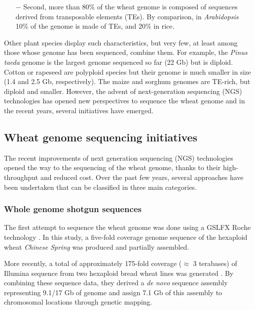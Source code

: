 \documentclass[a4paper, 12pt]{article}
\begin{document}
\begin{onehalfspace}
\begin{itemize}
\newpage %
\thispagestyle{empty}
~
\addtocounter{page}{-1}
\newpage
\clearpage %

\item[$-$] Second, more than 80\% of the wheat genome is composed of sequences derived from transposable elements (TEs). By comparison, in \textit{Arabidopsis} 10\% of the genome is made of TEs, and 20\% in rice.
\end{itemize}

Other plant species display such characteristics, but very few, at least among those whose genome has been sequenced, combine them. For example, the \textit{Pinus taeda} genome is the largest genome sequenced so far (22 Gb) but is diploid. Cotton or rapeseed are polyploid species but their genome is much smaller in size (1.4 and 2.5 Gb, respectively). The maize and sorghum genomes are TE-rich, but diploid and smaller. However, the advent of next-generation sequencing (NGS) technologies has opened new perspectives to sequence the wheat genome and in the recent years, several initiatives have emerged.

        \subsection{Wheat genome sequencing initiatives}

The recent improvements of next generation sequencing (NGS) technologies opened the way to the sequencing of the wheat genome, thanks to their high-throughput and reduced cost. Over the past few years, several approaches have been undertaken that can be classified in three main categories.

            \subsubsection{Whole genome shotgun sequences}

The first attempt to sequence the wheat genome was done using a GSLFX Roche technology \citep{Brenchley2012}. In this study, a five-fold coverage genome sequence of the hexaploid wheat \textit{Chinese Spring} was produced and partially assembled.

More recently, a total of approximately 175-fold coverage ($\approx$ 3 terabases) of Illumina sequence from two hexaploid bread wheat lines was generated \citep{Chapman2015}. By combining these sequence data, they derived a \textit{de novo} sequence assembly representing 9.1/17 Gb of genome and assign 7.1 Gb of this assembly to chromosomal locations through genetic mapping.


\end{onehalfspace}
\end{document}
